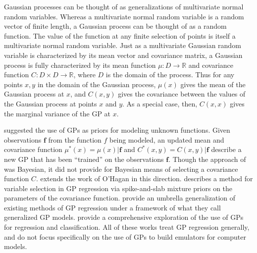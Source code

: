 \documentclass{article}
\begin{document}
Gaussian processes can be thought of as generalizations of multivariate normal random variables. Whereas a multivariate normal random variable is a random vector of finite length, a Gaussian process can be thought of as a random function. The value of the function at any finite selection of points is itself a multivariate normal random variable. Just as a multivariate Gaussian random variable is characterized by its mean vector and covariance matrix, a Gaussian process is fully characterized by its mean function $\mu:D\to \mathbb R$ and covariance function $C:D\times D\to \mathbb R$, where $D$ is the domain of the process. Thus for any points $x,y$ in the domain of the Gaussian process, $\mu(x)$ gives the mean of the Gaussian process at $x$, and $C(x,y)$ gives the covariance between the values of the Gaussian process at points $x$ and $y$. As a special case, then, $C(x,x)$ gives the marginal variance of the GP at $x$. 


\cite{OHagan1978} suggested the use of GPs as priors for modeling unknown functions. Given observations $\mathbf f$ from the function $f$ being modeled, an updated mean and covariance function $\mu^*(x)=\mu(x)|\mathbf f$ and $C^*(x,y) = C(x,y)|\mathbf f$ describe a new GP that has been ``trained'' on the observations $\mathbf f$. 
Though the approach of \cite{OHagan1978} was Bayesian, it did not provide for Bayesian means of selecting a covariance function $C$. \cite{Neal} extends the work of O'Hagan in this direction. \cite{Savitsky2011} describes a method for variable selection in GP regression via spike-and-slab mixture priors on the parameters of the covariance function. \cite{Shang2013} provide an umbrella generalization of existing methods of GP regression under a framework of what they call generalized GP models. \cite{Rasmussen2006} provide a comprehensive exploration of the use of GPs for regression and classification. All of these works treat GP regression generally, and do not focus specifically on the use of GPs to build emulators for computer models.
\end{document}
